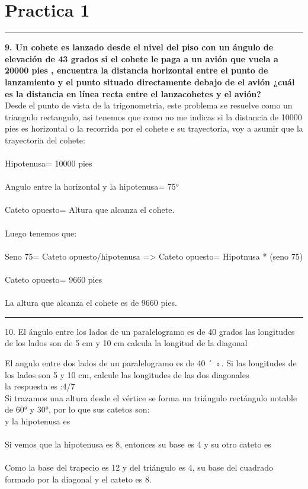 \documentclass[11pt]{article}
\begin{document}
\section{Practica 1}

\par\noindent\rule{\textwidth}{0.4pt}
\textbf{9.  Un cohete es lanzado desde el nivel del piso con un ángulo de elevación de 43 grados si el cohete le paga a un avión que vuela a 20000 pies , encuentra la distancia horizontal entre el punto de lanzamiento y el punto situado directamente debajo de el avión ¿cuál es la distancia en línea recta entre el lanzacohetes y el avión?}\\
Desde el punto de vista de la trigonometria, este problema se resuelve como un triangulo rectangulo, asi tenemos que como no me indicas si la distancia de 10000 pies es horizontal o la recorrida por el cohete e su trayectoria, voy a asumir que la trayectoria del cohete:  \\ 
\\ 
Hipotenusa= 10000 pies    \\ 
\\ 
Angulo entre la horizontal y la hipotenusa= 75°    \\ 
\\ 
Cateto opuesto= Altura que alcanza el cohete.      \\ 
\\ 
Luego tenemos que:      \\ 
\\ 
Seno 75= Cateto opuesto/hipotenusa => Cateto opuesto= Hipotnusa * (seno 75)      \\ 
\\ 
Cateto opuesto= 9660 pies    \\ 
\\ 
La altura que alcanza el cohete es de 9660 pies.\\ 
\par\noindent\rule{\textwidth}{0.4pt}
10.  El ángulo entre los lados de un paralelogramo es de 40 grados las longitudes de los lados son de 5 cm y 10 cm calcula la longitud de la diagonal

El angulo entre dos lados de un paralelogramo es de 40 ´ ◦. Si las longitudes de los lados son 5 y 10 cm, calcule las longitudes de las dos diagonales \\

la respuesta es  :4/7\\
Si  trazamos una altura desde el vértice se forma un triángulo rectángulo notable de 60° y 30°, por lo que sus catetos son:\\
y la hipotenusa es \\
\\
Si vemos que la hipotenusa es 8, entonces su base es 4 y su otro cateto es \\
\\
Como la base del trapecio es 12 y del triángulo es 4, su base del cuadrado formado por la diagonal y el cateto es 8.\\
\\
\end{document}
